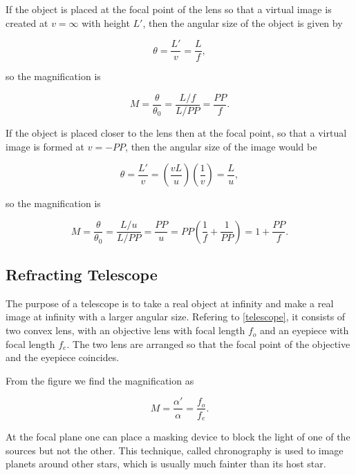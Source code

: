 \documentclass[english,a4paper,12pt]{report}
\begin{document}
If the object is placed at the focal point of the lens so that a virtual image is created at \(v = \infty\) with height \(L'\), then the angular size of the object is given by

\begin{equation}
    \theta = \frac{L'}{v} = \frac{L}{f},  
\end{equation}

so the magnification is 

\begin{equation}
    M = \frac{\theta }{\theta _{0} } = \frac{L/f}{L/PP} = \frac{PP}{f}. 
\end{equation}

If the object is placed closer to the lens then at the focal point, so that a virtual image is formed at \(v = -PP\), then the angular size of the image would be 

\begin{equation}
    \theta = \frac{L'}{v} = \left( \frac{vL}{u}  \right) \left( \frac{1}{v}  \right) = \frac{L}{u}, 
\end{equation}

so the magnification is 

\begin{equation}
    M = \frac{\theta }{\theta _{0} } = \frac{L /u}{L / PP} = \frac{PP}{u} = PP \left( \frac{1}{f} + \frac{1}{PP}   \right) = 1 + \frac{PP}{f}. 
\end{equation}

\subsection{Refracting Telescope}

The purpose of a telescope is to take a real object at infinity and make a real image at infinity with a larger angular size. Refering to \cref{telescope}, it consists of two convex lens, with an objective lens with focal length \(f_{o} \) and an eyepiece with focal length \(f_{e} \). The two lens are arranged so that the focal point of the objective and the eyepiece coincides. 


From the figure we find the magnification as 

\begin{equation}
    M = \frac{\alpha '}{\alpha } = \frac{f_{o}  }{f_{e} }.
\end{equation}

At the focal plane one can place a masking device to block the light of one of the sources but not the other. This technique, called chronography is used to image planets around other stars, which is usually much fainter than its host star.
\end{document}
